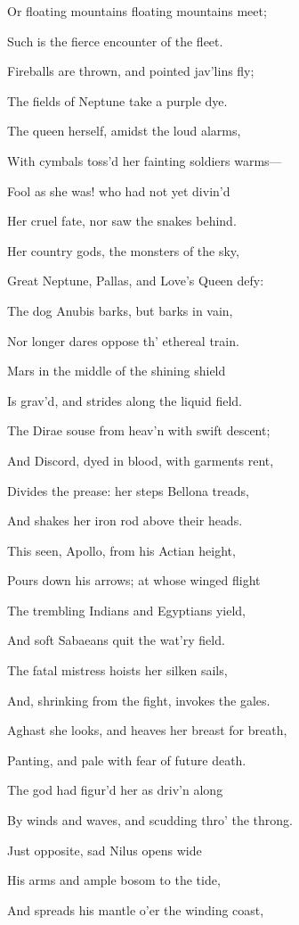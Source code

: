 Or floating mountains floating mountains meet;

Such is the fierce encounter of the fleet.

Fireballs are thrown, and pointed jav’lins fly;

The fields of Neptune take a purple dye.

The queen herself, amidst the loud alarms,

With cymbals toss’d her fainting soldiers warms—

Fool as she was! who had not yet divin’d

Her cruel fate, nor saw the snakes behind.

Her country gods, the monsters of the sky,

Great Neptune, Pallas, and Love’s Queen defy:

The dog Anubis barks, but barks in vain,

Nor longer dares oppose th’ ethereal train.

Mars in the middle of the shining shield

Is grav’d, and strides along the liquid field.

The Dirae souse from heav’n with swift descent;

And Discord, dyed in blood, with garments rent,

Divides the prease: her steps Bellona treads,

And shakes her iron rod above their heads.

This seen, Apollo, from his Actian height,

Pours down his arrows; at whose winged flight

The trembling Indians and Egyptians yield,

And soft Sabaeans quit the wat’ry field.

The fatal mistress hoists her silken sails,

And, shrinking from the fight, invokes the gales.

Aghast she looks, and heaves her breast for breath,

Panting, and pale with fear of future death.

The god had figur’d her as driv’n along

By winds and waves, and scudding thro’ the throng.

Just opposite, sad Nilus opens wide

His arms and ample bosom to the tide,

And spreads his mantle o’er the winding coast,

